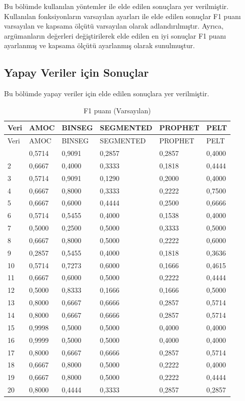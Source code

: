\documentclass[12pt,twoside]{deuthesis}
\begin{document}
Bu bölümde kullanılan yöntemler ile elde edilen sonuçlara yer verilmiştir. Kullanılan fonksiyonların varsayılan ayarları ile elde edilen sonuçlar F1 puanı varsayılan ve kapsama ölçütü varsayılan olarak adlandırılmıştır. Ayrıca, argümanların değerleri değiştirilerek elde edilen en iyi sonuçlar F1 puanı ayarlanmış ve kapsama ölçütü ayarlanmış olarak sunulmuştur.

\hypertarget{yapay-veriler-iuxe7in-sonuuxe7lar}{%
\subsection{Yapay Veriler için Sonuçlar}\label{yapay-veriler-iuxe7in-sonuuxe7lar}}

Bu bölümde yapay veriler için elde edilen sonuçlara yer verilmiştir.

\begin{longtable}[]{@{}llllll@{}}
\caption{\label{tab:nvar8} F1 puanı (Varsayılan)}\tabularnewline
\toprule\noalign{}
Veri & AMOC & BINSEG & SEGMENTED & PROPHET & PELT \\
\midrule\noalign{}
\endfirsthead
\toprule\noalign{}
Veri & AMOC & BINSEG & SEGMENTED & PROPHET & PELT \\
\midrule\noalign{}
\endhead
\bottomrule\noalign{}
\endlastfoot
1 & 0,5714 & 0,9091 & 0,2857 & 0,2857 & 0,4000 \\
2 & 0,6667 & 0,4000 & 0,3333 & 0,1818 & 0,4444 \\
3 & 0,5714 & 0,9091 & 0,1290 & 0,2000 & 0,4000 \\
4 & 0,6667 & 0,8000 & 0,3333 & 0,2222 & 0,7500 \\
5 & 0,6667 & 0,6000 & 0,4444 & 0,2500 & 0,6666 \\
6 & 0,5714 & 0,5455 & 0,4000 & 0,1538 & 0,4000 \\
7 & 0,5000 & 0,2500 & 0,5000 & 0,3333 & 0,5000 \\
8 & 0,6667 & 0,8000 & 0,5000 & 0,2222 & 0,6000 \\
9 & 0,2857 & 0,5455 & 0,4000 & 0,1818 & 0,3636 \\
10 & 0,5714 & 0,7273 & 0,6000 & 0,1666 & 0,4615 \\
11 & 0,6667 & 0,6000 & 0,5000 & 0,2222 & 0,4444 \\
12 & 0,5000 & 0,8333 & 0,1666 & 0,1666 & 0,5000 \\
13 & 0,8000 & 0,6667 & 0,6666 & 0,2857 & 0,5714 \\
14 & 0,8000 & 0,6667 & 0,6666 & 0,2857 & 0,5714 \\
15 & 0,9998 & 0,5000 & 0,5000 & 0,4000 & 0,4000 \\
16 & 0,9999 & 0,5000 & 0,5000 & 0,4000 & 0,4000 \\
17 & 0,8000 & 0,6667 & 0,6666 & 0,2857 & 0,5714 \\
18 & 0,6667 & 0,8000 & 0,5000 & 0,2222 & 0,4000 \\
19 & 0,6667 & 0,8000 & 0,5000 & 0,2222 & 0,4444 \\
20 & 0,8000 & 0,4444 & 0,3333 & 0,2857 & 0,2857 \\
\end{longtable}
\end{document}
